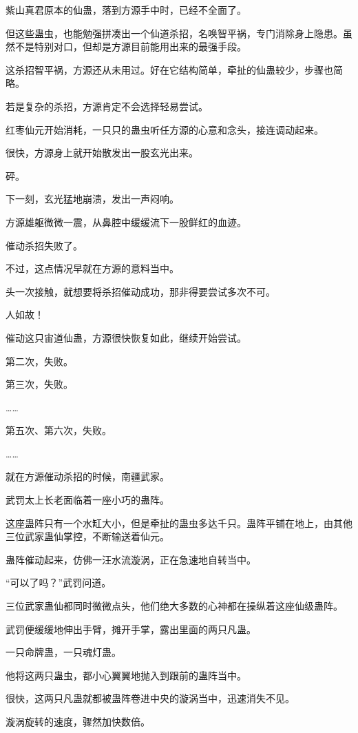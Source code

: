 \begin{this_body}
紫山真君原本的仙蛊，落到方源手中时，已经不全面了。

但这些蛊虫，也能勉强拼凑出一个仙道杀招，名唤智平祸，专门消除身上隐患。虽然不是特别对口，但却是方源目前能用出来的最强手段。

这杀招智平祸，方源还从未用过。好在它结构简单，牵扯的仙蛊较少，步骤也简略。

若是复杂的杀招，方源肯定不会选择轻易尝试。

红枣仙元开始消耗，一只只的蛊虫听任方源的心意和念头，接连调动起来。

很快，方源身上就开始散发出一股玄光出来。

砰。

下一刻，玄光猛地崩溃，发出一声闷响。

方源雄躯微微一震，从鼻腔中缓缓流下一股鲜红的血迹。

催动杀招失败了。

不过，这点情况早就在方源的意料当中。

头一次接触，就想要将杀招催动成功，那非得要尝试多次不可。

人如故！

催动这只宙道仙蛊，方源很快恢复如此，继续开始尝试。

第二次，失败。

第三次，失败。

……

第五次、第六次，失败。

……

就在方源催动杀招的时候，南疆武家。

武罚太上长老面临着一座小巧的蛊阵。

这座蛊阵只有一个水缸大小，但是牵扯的蛊虫多达千只。蛊阵平铺在地上，由其他三位武家蛊仙掌控，不断输送着仙元。

蛊阵催动起来，仿佛一汪水流漩涡，正在急速地自转当中。

“可以了吗？”武罚问道。

三位武家蛊仙都同时微微点头，他们绝大多数的心神都在操纵着这座仙级蛊阵。

武罚便缓缓地伸出手臂，摊开手掌，露出里面的两只凡蛊。

一只命牌蛊，一只魂灯蛊。

他将这两只蛊虫，都小心翼翼地抛入到跟前的蛊阵当中。

很快，这两只凡蛊就都被蛊阵卷进中央的漩涡当中，迅速消失不见。

漩涡旋转的速度，骤然加快数倍。


\end{this_body}
